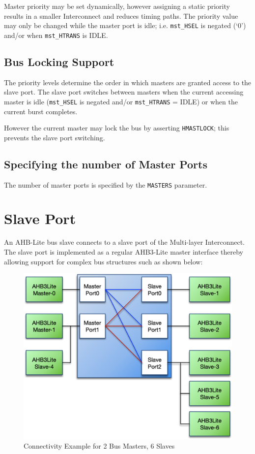 Master priority may be set dynamically, however assigning a static
priority results in a smaller Interconnect and reduces timing paths. The
priority value may only be changed while the master port is idle; i.e.
\texttt{mst\_HSEL} is negated (`0') and/or when \texttt{mst\_HTRANS} is IDLE.

\subsection{Bus Locking Support}\label{bus-locking-support}

The priority levels determine the order in which masters are granted
access to the slave port. The slave port switches between masters when
the current accessing master is idle (\texttt{mst\_HSEL} is negated and/or
\texttt{mst\_HTRANS} = IDLE) or when the current burst completes.

However the current master may lock the bus by asserting \texttt{HMASTLOCK}; this
prevents the slave port switching.

\subsection{Specifying the number of Master
Ports}\label{specifying-the-number-of-master-ports}

The number of master ports is specified by the \texttt{MASTERS} parameter.

\section{Slave Port}\label{slave-port}

An AHB-Lite bus slave connects to a slave port of the Multi-layer
Interconnect. The slave port is implemented as a regular AHB3-Lite master
interface thereby allowing support for complex bus structures such as
shown below:

\begin{figure}[tbh]
	\centering
	\includegraphics{assets/img/ahb-lite-switch-sys3}
	\caption{Connectivity Example	for 2 Bus Masters, 6 Slaves}
	\label{fig:ahb-lite-switch-sys3}
\end{figure}

